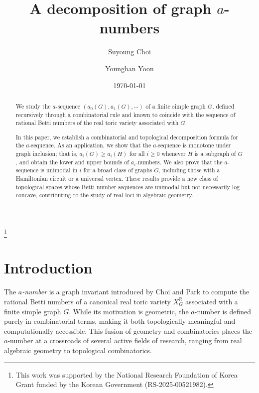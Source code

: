 \documentclass[10pt]{amsart}
\theoremstyle{plain}
\numberwithin{equation}{section}
\theoremstyle{definition}
\newcommand{\R}{\mathbb{R}}
\begin{document}
\title[A decomposition of graph $a$-numbers]{A decomposition of graph $a$-numbers}

\author[S. Choi]{Suyoung Choi}
\address{Department of mathematics, Ajou University, 206, World cup-ro, Yeongtong-gu, Suwon 16499,  Republic of Korea}

\author[Y. Yoon]{Younghan Yoon}
\address{Department of mathematics, Ajou University, 206, World cup-ro, Yeongtong-gu, Suwon 16499,  Republic of Korea}


\date{\today}





\thanks{This work was supported by the National Research Foundation of Korea Grant funded by
the Korean Government (RS-2025-00521982).}

\begin{abstract}
We study the $a$-sequence $(a_0(G), a_1(G), \cdots)$ of a finite simple graph $G$, defined recursively through a combinatorial rule and known to coincide with the sequence of rational Betti numbers of the real toric variety associated with $G$.

In this paper, we establish a combinatorial and topological decomposition formula for the $a$-sequence.
As an application, we show that the $a$-sequence is monotone under graph inclusion; that is, $a_i(G) \geq a_i(H)$ for all $i \geq 0$ whenever $H$ is a subgraph of $G$, and obtain the lower and upper bounds of $a_i$-numbers.
We also prove that the $a$-sequence is unimodal in $i$ for a broad class of graphs $G$, including those with a Hamiltonian circuit or a universal vertex. 
These results provide a new class of topological spaces whose Betti number sequences are unimodal but not necessarily log concave, contributing to the study of real loci in algebraic geometry.    
\end{abstract}
\maketitle

\section{Introduction}\label{sec:intro}
The \emph{$a$-number} is a graph invariant introduced by Choi and Park \cite{Choi-Park2015} to compute the rational Betti numbers of a canonical real toric variety $X^\R_G$ associated with a finite simple graph $G$. 
While its motivation is geometric, the $a$-number is defined purely in combinatorial terms, making it both topologically meaningful and computationally accessible. 
This fusion of geometry and combinatorics places the $a$-number at a crossroads of several active fields of research, ranging from real algebraic geometry to topological combinatorics.
\end{document}
